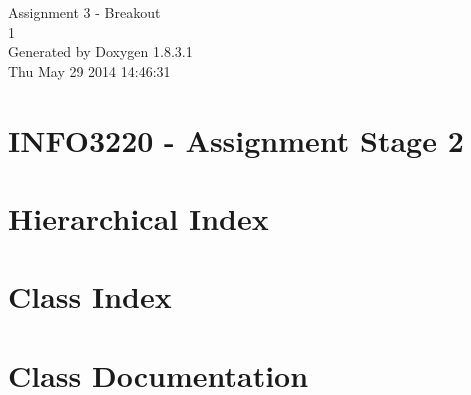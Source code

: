 \documentclass{book}
\begin{document}
\hypersetup{pageanchor=false,citecolor=blue}
\begin{titlepage}
\vspace*{7cm}
\begin{center}
{\Large Assignment 3 -\/ Breakout \\[1ex]\large 1 }\\
\vspace*{1cm}
{\large Generated by Doxygen 1.8.3.1}\\
\vspace*{0.5cm}
{\small Thu May 29 2014 14:46:31}\\
\end{center}
\end{titlepage}
\clearemptydoublepage
{}
\tableofcontents
\clearemptydoublepage
{}
\hypersetup{pageanchor=true,citecolor=blue}
\chapter{I\-N\-F\-O3220 -\/ Assignment Stage 2}
\label{md_README}
\hypertarget{md_README}{}

\chapter{Hierarchical Index}

\chapter{Class Index}

\chapter{Class Documentation}






























\printindex
\end{document}
